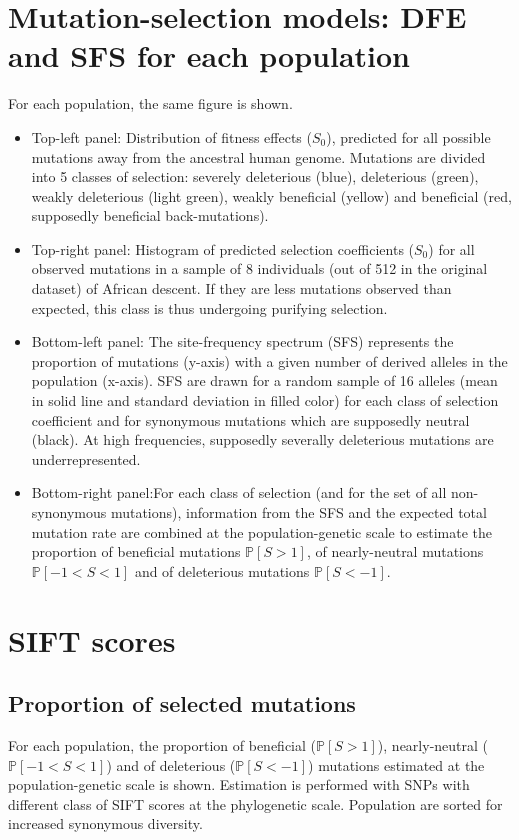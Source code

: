 \documentclass{article}
\newcommand{\proba}{\mathbb{P}}
\newcommand{\Sphy}{S_{0}}
\newcommand{\Spop}{S}
\newcommand{\polyDel}{\Spop < -1}
\newcommand{\polyNeutral}{-1 < \Spop < 1}
\newcommand{\polyAdv}{ \Spop > 1}
\newcommand{\PpolyDel}{\proba \left[ \polyDel \right]}
\newcommand{\PpolyNeutral}{\proba \left[ \polyNeutral \right]}
\newcommand{\PpolyAdv}{\proba \left[ \polyAdv \right]}
\begin{document}
    \section{Mutation-selection models: DFE and SFS for each population}\label{sec:mutation-selection-models:-histograms-and-sfs-for-each-population}
    For each population, the same figure is shown.
    \begin{itemize}
        \item Top-left panel: Distribution of fitness effects ($\Sphy$), predicted for all possible mutations away from the ancestral human genome.
        Mutations are divided into 5 classes of selection: severely deleterious (blue), deleterious (green), weakly deleterious (light green), weakly beneficial (yellow) and beneficial (red, supposedly beneficial back-mutations).
        \item Top-right panel: Histogram of predicted selection coefficients ($\Sphy$) for all observed mutations in a sample of 8 individuals (out of 512 in the original dataset) of African descent.
        If they are less mutations observed than expected, this class is thus undergoing purifying selection.
        \item Bottom-left panel: The site-frequency spectrum (SFS) represents the proportion of mutations (y-axis) with a given number of derived alleles in the population (x-axis).
        SFS are drawn for a random sample of 16 alleles (mean in solid line and standard deviation in filled color) for each class of selection coefficient and for synonymous mutations which are supposedly neutral (black).
        At high frequencies, supposedly severally deleterious mutations are underrepresented.
        \item Bottom-right panel:For each class of selection (and for the set of all non-synonymous mutations), information from the SFS and the expected total mutation rate are combined at the population-genetic scale to estimate the proportion of beneficial mutations $\PpolyAdv$, of nearly-neutral mutations $\PpolyNeutral$ and of deleterious mutations $\PpolyDel$.
    \end{itemize}

    

    \newpage
    \section{SIFT scores}\label{sec:sift-scores}

    \subsection{Proportion of selected mutations}\label{subsec:proportion-of-selected-mutations}
    For each population, the proportion of beneficial ($\PpolyAdv$), nearly-neutral ($\PpolyNeutral$) and of deleterious ($\PpolyDel$) mutations estimated at the population-genetic scale is shown.
    Estimation is performed with SNPs with different class of SIFT scores at the phylogenetic scale.
    Population are sorted for increased synonymous diversity.
\end{document}

